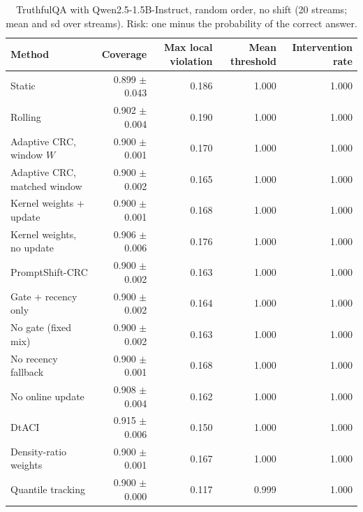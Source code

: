 \begin{table}[H]
\centering
\small
\caption{TruthfulQA with Qwen2.5-1.5B-Instruct, random order, no shift (20 streams; mean and sd over streams). Risk: one minus the probability of the correct answer.}
\label{tab:truthfulqa_iid}
\begin{tabular}{lrrrr}
\toprule
Method & Coverage & Max local violation & Mean threshold & Intervention rate \\
\midrule
Static & 0.899 $\pm$ 0.043 & 0.186 & 1.000 & 1.000 \\
Rolling & 0.902 $\pm$ 0.004 & 0.190 & 1.000 & 1.000 \\
Adaptive CRC, window $W$ & 0.900 $\pm$ 0.001 & 0.170 & 1.000 & 1.000 \\
Adaptive CRC, matched window & 0.900 $\pm$ 0.002 & 0.165 & 1.000 & 1.000 \\
Kernel weights + update & 0.900 $\pm$ 0.001 & 0.168 & 1.000 & 1.000 \\
Kernel weights, no update & 0.906 $\pm$ 0.006 & 0.176 & 1.000 & 1.000 \\
PromptShift-CRC & 0.900 $\pm$ 0.002 & 0.163 & 1.000 & 1.000 \\
Gate + recency only & 0.900 $\pm$ 0.002 & 0.164 & 1.000 & 1.000 \\
No gate (fixed mix) & 0.900 $\pm$ 0.002 & 0.163 & 1.000 & 1.000 \\
No recency fallback & 0.900 $\pm$ 0.001 & 0.168 & 1.000 & 1.000 \\
No online update & 0.908 $\pm$ 0.004 & 0.162 & 1.000 & 1.000 \\
DtACI & 0.915 $\pm$ 0.006 & 0.150 & 1.000 & 1.000 \\
Density-ratio weights & 0.900 $\pm$ 0.001 & 0.167 & 1.000 & 1.000 \\
Quantile tracking & 0.900 $\pm$ 0.000 & 0.117 & 0.999 & 1.000 \\
\bottomrule
\end{tabular}
\end{table}

